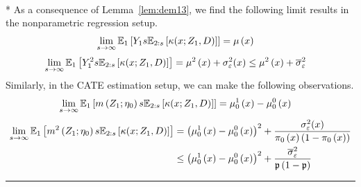 \begin{lem}\label{lem:limit_res}\mbox{}\\*
	As a consequence of Lemma~\ref{lem:dem13}, we find the following limit results in the nonparametric regression setup.
	\begin{equation}
		\begin{aligned}
			\lim_{s \rightarrow \infty} \mathbb{E}_{1}\left[Y_1 s \mathbb{E}_{2:s}\left[\kappa(x; Z_1, D)\right]\right]
			 & = \mu\left(x\right)
		\end{aligned}
	\end{equation}
	\begin{equation}
		\begin{aligned}
			\lim_{s \rightarrow \infty} \mathbb{E}_{1}\left[Y_1^2 s \mathbb{E}_{2:s}\left[\kappa(x; Z_1, D)\right]\right]
			 & = \mu^2\left(x\right) + \sigma_{\varepsilon}^{2}(x)
			\leq \mu^2\left(x\right) + \overline{\sigma}_{\varepsilon}^{2}
		\end{aligned}
	\end{equation}
	Similarly, in the CATE estimation setup, we can make the following observations.
	\begin{equation}
		\begin{aligned}
			\lim_{s \rightarrow \infty} \mathbb{E}_{1}\left[m\left(Z_{1}; \eta_{0}\right) s \mathbb{E}_{2:s}\left[\kappa(x; Z_1, D)\right]\right]
			 & = \mu_{0}^{1}\left(x\right) - \mu_{0}^{0}\left(x\right)
		\end{aligned}
	\end{equation}
	\begin{equation}
		\begin{aligned}
			\lim_{s \rightarrow \infty} \mathbb{E}_{1}\left[m^2\left(Z_{1}; \eta_{0}\right) s \mathbb{E}_{2:s}\left[\kappa(x; Z_1, D)\right]\right]
			 & = \left(\mu_{0}^{1}\left(x\right) - \mu_{0}^{0}\left(x\right)\right)^2 + \frac{\sigma_{\varepsilon}^2(x)}{\pi_{0}\left(x\right)\left(1 - \pi_{0}\left(x\right)\right)}  \\
			 & \leq \left(\mu_{0}^{1}\left(x\right) - \mu_{0}^{0}\left(x\right)\right)^2 + \frac{\overline{\sigma}_{\varepsilon}^2}{\mathfrak{p}\left(1 - \mathfrak{p}\right)}
		\end{aligned}
	\end{equation}
\end{lem}

\hrule

